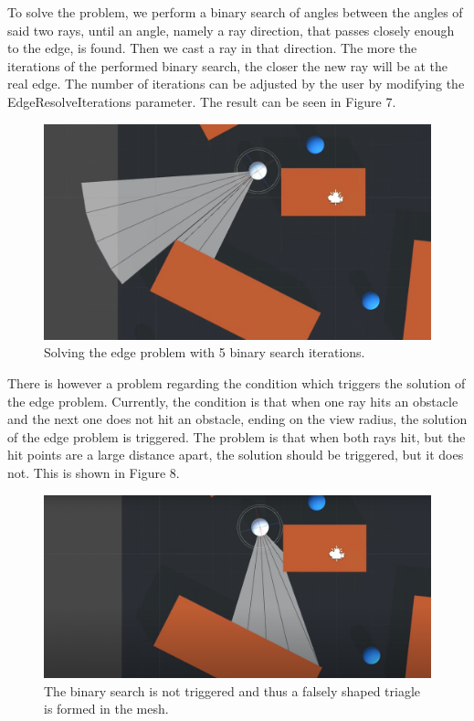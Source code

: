 \documentclass{article}
\begin{document}
To solve the problem, we perform a binary search of angles between the angles of said two rays, until an angle, namely a ray direction, that passes closely enough to the edge, is found. Then we cast a ray in that direction. The more the iterations of the performed binary search, the closer the new ray will be at the real edge. The number of iterations can be adjusted by the user by modifying the EdgeResolveIterations parameter. The result can be seen in Figure 7. 

\begin{figure} %
	\centering
	\includegraphics[width=1\columnwidth]{FOV(8).png} %
	\caption{Solving the edge problem with 5 binary search iterations.}
\end{figure}

There is however a problem regarding the condition which triggers the solution of the edge problem. Currently, the condition is that when one ray hits an obstacle and the next one does not hit an obstacle, ending on the view radius, the solution of the edge problem is triggered. The problem is that when both rays hit, but the hit points are a large distance apart, the solution should be triggered, but it does not. This is shown in Figure 8. 

\begin{figure} %
	\centering
	\includegraphics[width=1\columnwidth]{FOV(9).png} %
	\caption{The binary search is not triggered and thus a falsely shaped triagle is formed in the mesh.}
\end{figure}
\end{document}
